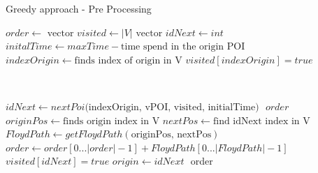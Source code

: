 \documentclass{article}
\begin{document}
    \begin{algorithm}[h]
    \caption{Greedy approach - Pre Processing}
    \begin{algorithmic}[1]
        \State $order \leftarrow \text{ vector}$ 
		\State $visited \leftarrow |V| \text{ vector}$
        \State $idNext \leftarrow int$  
        \State $initalTime \gets maxTime - \text{time spend in the origin POI}$
        \State $ $
        \State $indexOrigin \gets \text{finds index of origin in V}$
        \State $visited[indexOrigin] = true$  
        
        \State $ $
        
            \State $idNext \gets nextPoi\text{(indexOrigin, vPOI, visited, initialTime)}$ 
            \State $ $
            \Return $order$  
            \EndIf
            \State $ $
            \State $originPos \gets \text{finds origin index in V}$
            \State $nextPos \gets \text{find idNext index in V}$
            \State $FloydPath \gets getFloydPath(\text{originPos, nextPos})$
            \State $ $
            \State $order \gets order[0... |order|-1] + FloydPath[0...|FloydPath|-1]$ 
            \State $ $
            \State $visited[idNext] = true$  
            \State $origin \gets idNext$
        \EndFor
    \State $ $
    \Return order
    \EndProcedure
    \end{algorithmic}
\end{algorithm}
\newpage
\end{document}
